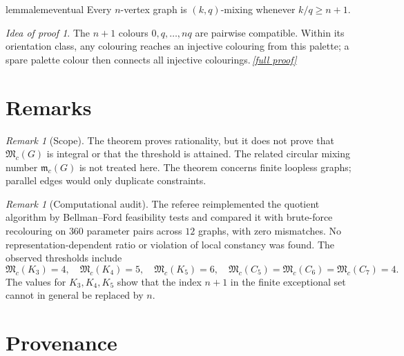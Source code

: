 \documentclass[11pt,a4paper]{article}
\theoremstyle{plain}
\theoremstyle{definition}
\theoremstyle{remark}
\newtheorem{remark}[theorem]{Remark}
\newtheorem*{proofidea}{Idea of proof}
\newcommand{\fullproofref}[1]{\,\hyperref[#1]{\textit{[full proof]}}}
\newcommand{\Mc}{\mathfrak M_c}
\begin{document}
\begin{restatable}{lemma}{lemeventual}\label{lem:eventual}
Every $n$-vertex graph is $(k,q)$-mixing whenever $k/q\ge n+1$.
\end{restatable}
\begin{proofidea}
The $n+1$ colours $0,q,\ldots,nq$ are pairwise compatible.  Within its orientation
class, any colouring reaches an injective colouring from this palette; a spare palette
colour then connects all injective colourings.\fullproofref{pf:eventual}
\end{proofidea}

\section{Remarks}

\begin{remark}[Scope]
The theorem proves rationality, but it does not prove that $\Mc(G)$ is integral or that
the threshold is attained.  The related circular mixing number $\mathfrak m_c(G)$ is
not treated here.  The theorem concerns finite loopless graphs; parallel edges would
only duplicate constraints.
\end{remark}

\begin{remark}[Computational audit]
The referee reimplemented the quotient algorithm by Bellman--Ford feasibility tests and
compared it with brute-force recolouring on $360$ parameter pairs across $12$ graphs,
with zero mismatches.  No representation-dependent ratio or violation of local
constancy was found.  The observed thresholds include
\[
 \Mc(K_3)=4,\quad \Mc(K_4)=5,\quad \Mc(K_5)=6,
 \quad \Mc(C_5)=\Mc(C_6)=\Mc(C_7)=4.
\]
The values for $K_3,K_4,K_5$ show that the index $n+1$ in the finite exceptional set
cannot in general be replaced by $n$.
\end{remark}

\section{Provenance}\label{sec:provenance}
\end{document}
